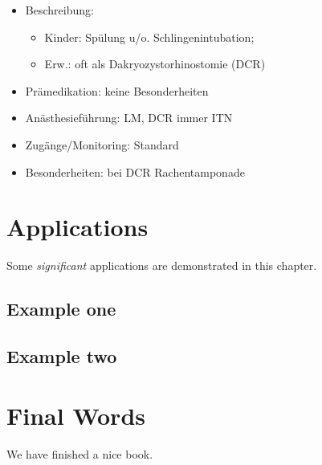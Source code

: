 \documentclass[
]{book}
\providecommand{\tightlist}{%
  \setlength{\itemsep}{0pt}\setlength{\parskip}{0pt}}
\begin{document}
\begin{itemize}
\tightlist
\item
  Beschreibung:

  \begin{itemize}
  \tightlist
  \item
    Kinder: Spülung u/o. Schlingenintubation;
  \item
    Erw.: oft als Dakryozystorhinostomie (DCR)
  \end{itemize}
\item
  Prämedikation: keine Besonderheiten
\item
  Anästhesieführung: LM, DCR immer ITN
\item
  Zugänge/Monitoring: Standard
\item
  Besonderheiten: bei DCR Rachentamponade
\end{itemize}

\hypertarget{applications}{%
\chapter{Applications}\label{applications}}

Some \emph{significant} applications are demonstrated in this chapter.

\hypertarget{example-one}{%
\section{Example one}\label{example-one}}

\hypertarget{example-two}{%
\section{Example two}\label{example-two}}

\hypertarget{final-words}{%
\chapter{Final Words}\label{final-words}}

We have finished a nice book.

  
\end{document}
